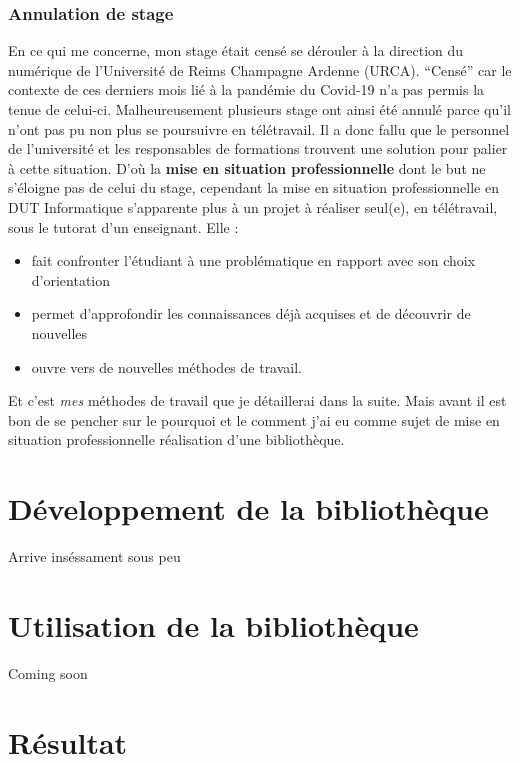 \documentclass[11pt,a4paper,krantz2,11pt,oneside]{krantz}
\providecommand{\tightlist}{%
  \setlength{\itemsep}{0pt}\setlength{\parskip}{0pt}}
\begin{document}
\hypertarget{annulation-de-stage}{%
\subsection{Annulation de stage}\label{annulation-de-stage}}

En ce qui me concerne, mon stage était censé se dérouler à la direction du numérique de l'Université de Reims Champagne Ardenne (URCA). ``Censé'' car le contexte de ces derniers mois lié à la pandémie du Covid-19 n'a pas permis la tenue de celui-ci. Malheureusement plusieurs stage ont ainsi été annulé parce qu'il n'ont pas pu non plus se poursuivre en télétravail. Il a donc fallu que le personnel de l'université et les responsables de formations trouvent une solution pour palier à cette situation. D'où la \textbf{mise en situation professionnelle} dont le but ne s'éloigne pas de celui du stage, cependant la mise en situation professionnelle en DUT Informatique s'apparente plus à un projet à réaliser seul(e), en télétravail, sous le tutorat d'un enseignant. Elle :

\begin{itemize}
\tightlist
\item
  fait confronter l'étudiant à une problématique en rapport avec son choix d'orientation
\item
  permet d'approfondir les connaissances déjà acquises et de découvrir de nouvelles
\item
  ouvre vers de nouvelles méthodes de travail.
\end{itemize}

Et c'est \emph{mes} méthodes de travail que je détaillerai dans la suite. Mais avant il est bon de se pencher sur le pourquoi et le comment j'ai eu comme sujet de mise en situation professionnelle réalisation d'une bibliothèque.

\hypertarget{dev}{%
\chapter{Développement de la bibliothèque}\label{dev}}

Arrive inséssament sous peu

\hypertarget{utils}{%
\chapter{Utilisation de la bibliothèque}\label{utils}}

Coming soon

\hypertarget{res}{%
\chapter{Résultat}\label{res}}
\end{document}
